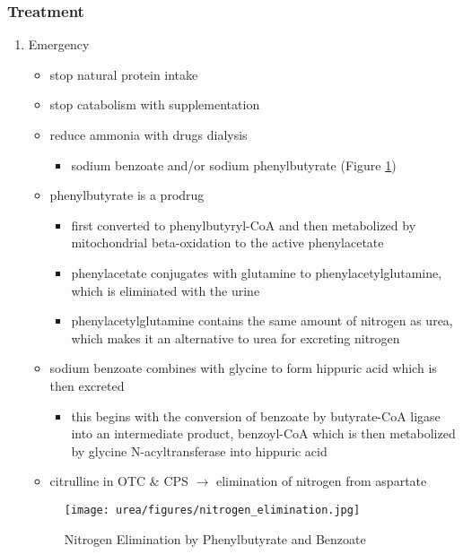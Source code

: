 \documentclass[12pt]{scrartcl}
\begin{document}
\begin{center}
\begin{center}
\subsubsection{Treatment}
\label{sec:org3730b08}
\begin{enumerate}
\item Emergency
\label{sec:orgbf75067}
\begin{itemize}
\item stop natural protein intake
\item stop catabolism with supplementation
\item reduce ammonia with drugs \textpm{} dialysis
\begin{itemize}
\item sodium benzoate and/or sodium phenylbutyrate (Figure \ref{fig:orgf2bf561})
\end{itemize}

\item phenylbutyrate is a prodrug
\begin{itemize}
\item first converted to phenylbutyryl-CoA and then metabolized by mitochondrial
beta-oxidation to the active phenylacetate
\item phenylacetate conjugates with glutamine to phenylacetylglutamine,
which is eliminated with the urine
\item phenylacetylglutamine contains the same amount of nitrogen as
urea, which makes it an alternative to urea for excreting nitrogen
\end{itemize}

\item sodium benzoate combines with glycine to form hippuric acid which is
then excreted
\begin{itemize}
\item this begins with the conversion of benzoate by butyrate-CoA ligase
into an intermediate product, benzoyl-CoA which is then
metabolized by glycine N-acyltransferase into hippuric acid
\end{itemize}
\item citrulline in OTC \& CPS \(\to\) elimination of nitrogen from aspartate
\end{itemize}


\begin{figure}[htbp]
\centering
\texttt{[image: urea/figures/nitrogen\_elimination.jpg]}
\caption{\label{fig:orgf2bf561}Nitrogen Elimination by Phenylbutyrate and Benzoate}
\end{figure}


\end{enumerate}
\end{center}
\end{center}
\end{document}

